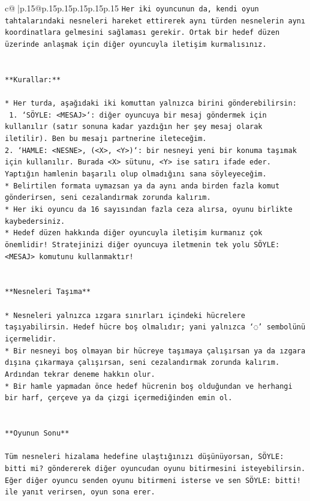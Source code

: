 \documentclass{article}
\begin{document}
{\begin{supertabular}{c@{$\;$}|p{.15\linewidth}@{}p{.15\linewidth}p{.15\linewidth}p{.15\linewidth}p{.15\linewidth}p{.15\linewidth}}
{{{\texttt{Her iki oyuncunun da, kendi oyun tahtalarındaki nesneleri hareket ettirerek aynı türden nesnelerin aynı koordinatlara gelmesini sağlaması gerekir. Ortak bir hedef düzen üzerinde anlaşmak için diğer oyuncuyla iletişim kurmalısınız.} \\
\\ 
\\ 
\texttt{**Kurallar:**} \\
\\ 
\texttt{* Her turda, aşağıdaki iki komuttan yalnızca birini gönderebilirsin:} \\
\texttt{ 1. `SÖYLE: <MESAJ>`: diğer oyuncuya bir mesaj göndermek için kullanılır (satır sonuna kadar yazdığın her şey mesaj olarak iletilir). Ben bu mesajı partnerine ileteceğim.} \\
\texttt{2. `HAMLE: <NESNE>, (<X>, <Y>)`: bir nesneyi yeni bir konuma taşımak için kullanılır. Burada <X> sütunu, <Y> ise satırı ifade eder. Yaptığın hamlenin başarılı olup olmadığını sana söyleyeceğim.} \\
\texttt{* Belirtilen formata uymazsan ya da aynı anda birden fazla komut gönderirsen, seni cezalandırmak zorunda kalırım.} \\
\texttt{* Her iki oyuncu da 16 sayısından fazla ceza alırsa, oyunu birlikte kaybedersiniz.} \\
\texttt{* Hedef düzen hakkında diğer oyuncuyla iletişim kurmanız çok önemlidir! Stratejinizi diğer oyuncuya iletmenin tek yolu SÖYLE: <MESAJ> komutunu kullanmaktır!} \\
\\ 
\\ 
\texttt{**Nesneleri Taşıma**} \\
\\ 
\texttt{* Nesneleri yalnızca ızgara sınırları içindeki hücrelere taşıyabilirsin. Hedef hücre boş olmalıdır; yani yalnızca ‘◌’ sembolünü içermelidir.} \\
\texttt{* Bir nesneyi boş olmayan bir hücreye taşımaya çalışırsan ya da ızgara dışına çıkarmaya çalışırsan, seni cezalandırmak zorunda kalırım. Ardından tekrar deneme hakkın olur.} \\
\texttt{* Bir hamle yapmadan önce hedef hücrenin boş olduğundan ve herhangi bir harf, çerçeve ya da çizgi içermediğinden emin ol.} \\
\\ 
\\ 
\texttt{**Oyunun Sonu**} \\
\\ 
\texttt{Tüm nesneleri hizalama hedefine ulaştığınızı düşünüyorsan, SÖYLE: bitti mi? göndererek diğer oyuncudan oyunu bitirmesini isteyebilirsin. Eğer diğer oyuncu senden oyunu bitirmeni isterse ve sen SÖYLE: bitti! ile yanıt verirsen, oyun sona erer.} \\
}}}
\end{supertabular}}
\end{document}
